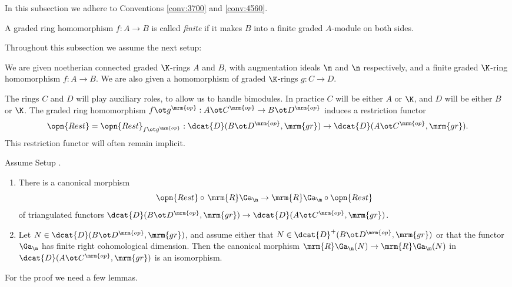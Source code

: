 \label{subsec:bal-trace}

In this subsection we adhere to Conventions \ref{conv:3700} and \ref{conv:4560}.

\begin{dfn} \label{dfn:3765}
A graded ring homomorphism $f : A \to B$ is called {\em finite} if it makes $B$ 
into a finite graded $A$-module on both sides. 
\end{dfn}

Throughout this subsection we assume the next setup: 

\begin{setup} \label{setup:3765} 
We are given noetherian connected graded $\K$-rings $A$ and $B$, with 
augmentation ideals $\m$ and $\n$ respectively, and a finite graded
$\K$-ring homomorphism $f : A \to B$. 
We are also given a homomorphism of graded $\K$-rings  $g : C \to D$. 
\end{setup}

The rings $C$ and $D$ will play auxiliary roles, to allow us to handle 
bimodules. In practice $C$ will be 
either $A$ or $\K$, and $D$ will be either $B$ or $\K$.
The graded ring homomorphism 
$f \ot g^{\mrm{op}} : A \ot C^{\mrm{op}} \to B \ot D^{\mrm{op}}$
induces a  restriction functor
\[ \opn{Rest} = \opn{Rest}_{f \ot g^{\mrm{op}}}
 : \dcat{D}(B \ot D^{\mrm{op}}, \mrm{gr}) \to 
\dcat{D}(A \ot C^{\mrm{op}}, \mrm{gr}) . \]
This restriction functor will often remain implicit. 

\begin{thm} \label{thm:3783}
Assume Setup \tup{\ref{setup:3765}}.
\begin{enumerate}
\item There is a canonical morphism
\[ \opn{Rest} \circ \, \mrm{R} \Ga_{\n} \to 
\mrm{R} \Ga_{\m} \circ \opn{Rest} \]
of triangulated functors 
$\dcat{D}(B \ot D^{\mrm{op}}, \mrm{gr}) \to 
\dcat{D}(A \ot C^{\mrm{op}}, \mrm{gr})$.

\item Let $N \in \dcat{D}(B \ot D^{\mrm{op}}, \mrm{gr})$, and assume either 
that 
$N \in \dcat{D}^+(B \ot D^{\mrm{op}}, \mrm{gr})$ 
or that the functor $\Ga_{\m}$ has finite right cohomological dimension. 
Then the canonical morphism
$\mrm{R} \Ga_{\n}(N) \to \mrm{R} \Ga_{\m}(N)$
in $\dcat{D}(A \ot C^{\mrm{op}}, \mrm{gr})$ is an isomorphism. 
\end{enumerate}
\end{thm}

For the proof we need a few lemmas.

